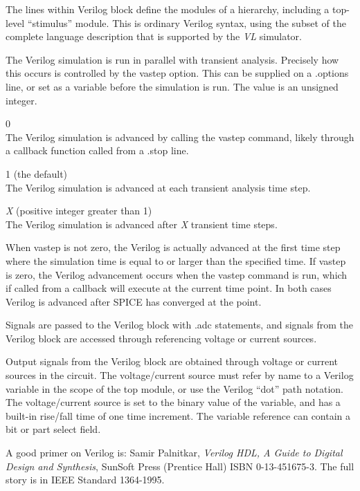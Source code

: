 The lines within Verilog block define the modules of a hierarchy,
including a top-level ``stimulus'' module.  This is ordinary Verilog
syntax, using the subset of the complete language description that is
supported by the {\it VL} simulator.

The Verilog simulation is run in parallel with transient analysis. 
Precisely how this occurs is controlled by the {\et vastep} option. 
This can be supplied on a {\vt .options} line, or set as a variable
before the simulation is run.  The value is an unsigned integer.
\begin{description}
\item{0}\\
The Verilog simulation is advanced by calling the {\cb vastep}
command, likely through a callback function called from a {\vt .stop}
line.

\item{1 (the default)}\\
The Verilog simulation is advanced at each transient analysis time
step.

\item{\it X} (positive integer greater than 1)\\
The Verilog simulation is advanced after {\it X} transient time steps.
\end{description}

When {\vt vastep} is not zero, the Verilog is actually advanced at the
first time step where the simulation time is equal to or larger than
the specified time.  If {\vt vastep} is zero, the Verilog advancement
occurs when the {\cb vastep} command is run, which if called from a
callback will execute at the current time point.  In both cases
Verilog is advanced after SPICE has converged at the point.

Signals are passed to the Verilog block with {\vt .adc} statements,
and signals from the Verilog block are accessed through referencing
voltage or current sources.

Output signals from the Verilog block are obtained through voltage or
current sources in the circuit.  The voltage/current source must refer
by name to a Verilog variable in the scope of the top module, or use
the Verilog ``dot'' path notation.  The voltage/current source is set
to the binary value of the variable, and has a built-in rise/fall time
of one time increment.  The variable reference can contain a bit or
part select field.

A good primer on Verilog is:  Samir Palnitkar, {\it Verilog HDL, A
Guide to Digital Design and Synthesis}, SunSoft Press (Prentice Hall)
ISBN 0-13-451675-3.  The full story is in IEEE Standard 1364-1995.

